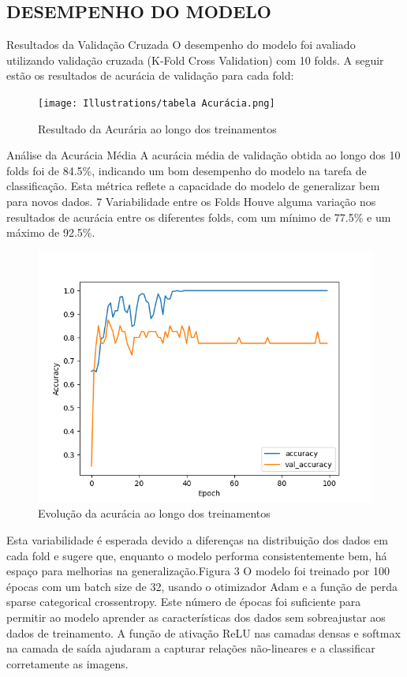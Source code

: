 \subsection*{DESEMPENHO DO MODELO}
Resultados da Validação Cruzada
O desempenho do modelo foi avaliado utilizando validação cruzada (K-Fold Cross Validation) com 10 folds. A seguir estão os resultados de acurácia de validação para cada fold:

\begin{figure}[!h]
    \centering
    \caption{Resultado da Acurária ao longo dos treinamentos}
    \label{Gráfico 3}
    \texttt{[image: Illustrations/tabela Acurácia.png]}
\end{figure}

Análise da Acurácia Média A acurácia média de validação obtida ao longo dos 10 folds foi de 84.5\%, indicando um bom desempenho do modelo na tarefa de classificação. Esta métrica reflete a capacidade do modelo de generalizar bem para novos dados. 7 Variabilidade entre os Folds Houve alguma variação nos resultados de acurácia entre os diferentes folds, com um mínimo de 77.5\% e um máximo de 92.5\%.

\begin{figure}[!h]
    \centering
    \caption{Evolução da acurácia ao longo dos treinamentos}
    \label{Gráfico 3}
    \includegraphics[width=0.7\linewidth]{Illustrations/Figure_1.png}
\end{figure}

Esta variabilidade é esperada devido a diferenças na distribuição dos dados em cada fold e sugere que, enquanto o modelo performa consistentemente bem, há espaço para melhorias na generalização.Figura 3 O modelo foi treinado por 100 épocas com um batch size de 32, usando o otimizador Adam e a função de perda sparse categorical crossentropy. Este número de épocas foi suficiente para permitir ao modelo aprender as características dos dados sem sobreajustar aos dados de treinamento. A função de ativação ReLU nas camadas densas e softmax na camada de saída ajudaram a capturar relações não-lineares e a classificar corretamente as imagens.